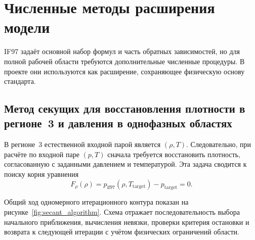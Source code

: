 \section{Численные методы расширения модели}

IF97 задаёт основной набор формул и часть обратных зависимостей,
но для полной рабочей области требуются дополнительные численные процедуры.
В проекте они используются как расширение,
сохраняющее физическую основу стандарта.

\subsection[Метод секущих для региона~3 и однофазных областей]{Метод секущих для восстановления плотности в регионе~3 и давления в однофазных областях}

В регионе~3 естественной входной парой является $(\rho, T)$.
Следовательно, при расчёте по входной паре $(p, T)$
сначала требуется восстановить плотность,
согласованную с заданными давлением и температурой.
Эта задача сводится к поиску корня уравнения
\begin{equation}
F_{\rho}(\rho) = p_{\mathrm{if97}}(\rho, T_{\mathrm{target}}) - p_{\mathrm{target}} = 0.
\end{equation}

Общий ход одномерного итерационного контура показан на рисунке~\ref{fig:secant_algorithm}.
Схема отражает последовательность выбора начального приближения,
вычисления невязки, проверки критерия остановки
и возврата к следующей итерации с учётом физических ограничений области.

